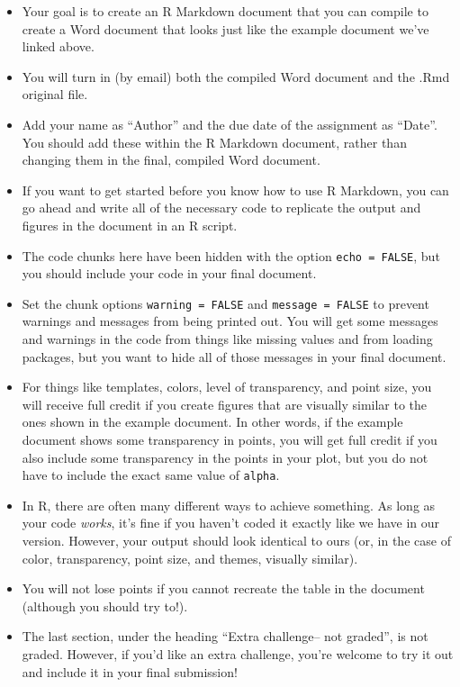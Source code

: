 \documentclass[]{book}
\providecommand{\tightlist}{%
  \setlength{\itemsep}{0pt}\setlength{\parskip}{0pt}}
\theoremstyle{definition}
\theoremstyle{definition}
\theoremstyle{definition}
\theoremstyle{remark}
\begin{document}
\begin{itemize}
\tightlist
\item
  Your goal is to create an R Markdown document that you can compile to
  create a Word document that looks just like the example document we've
  linked above.
\item
  You will turn in (by email) both the compiled Word document and the
  .Rmd original file.
\item
  Add your name as ``Author'' and the due date of the assignment as
  ``Date''. You should add these within the R Markdown document, rather
  than changing them in the final, compiled Word document.
\item
  If you want to get started before you know how to use R Markdown, you
  can go ahead and write all of the necessary code to replicate the
  output and figures in the document in an R script.
\item
  The code chunks here have been hidden with the option
  \texttt{echo\ =\ FALSE}, but you should include your code in your
  final document.
\item
  Set the chunk options \texttt{warning\ =\ FALSE} and
  \texttt{message\ =\ FALSE} to prevent warnings and messages from being
  printed out. You will get some messages and warnings in the code from
  things like missing values and from loading packages, but you want to
  hide all of those messages in your final document.
\item
  For things like templates, colors, level of transparency, and point
  size, you will receive full credit if you create figures that are
  visually similar to the ones shown in the example document. In other
  words, if the example document shows some transparency in points, you
  will get full credit if you also include some transparency in the
  points in your plot, but you do not have to include the exact same
  value of \texttt{alpha}.
\item
  In R, there are often many different ways to achieve something. As
  long as your code \emph{works}, it's fine if you haven't coded it
  exactly like we have in our version. However, your output should look
  identical to ours (or, in the case of color, transparency, point size,
  and themes, visually similar).
\item
  You will not lose points if you cannot recreate the table in the
  document (although you should try to!).
\item
  The last section, under the heading ``Extra challenge-- not graded'',
  is not graded. However, if you'd like an extra challenge, you're
  welcome to try it out and include it in your final submission!
\end{itemize}
\end{document}
